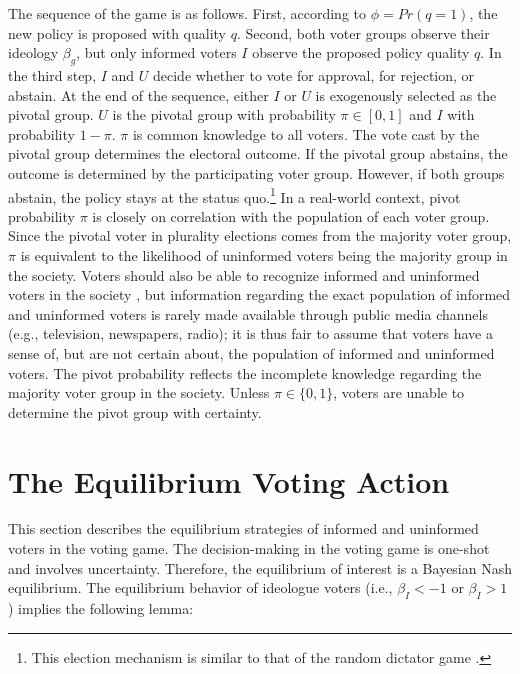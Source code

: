 \documentclass[doc,natbib,12pt]{apa6}
\begin{document}
	\par The sequence of the game is as follows. First, according to $\phi = Pr(q=1)$, the new policy is proposed with quality $q$. Second, both voter groups observe their ideology $\beta_g$, but only informed voters $I$ observe the proposed policy quality $q$. In the third step, $I$ and $U$ decide whether to vote for approval, for rejection, or abstain. At the end of the sequence, either $I$ or $U$ is exogenously selected as the pivotal group. $U$ is the pivotal group with probability $\pi \in [0, 1]$ and $I$ with probability $1-\pi$. $\pi$ is common knowledge to all voters. The vote cast by the pivotal group determines the electoral outcome. If the pivotal group abstains, the outcome is determined by the participating voter group. However, if both groups abstain, the policy stays at the status quo.\footnote{This election mechanism is similar to that of the random dictator game \citep{Morton2015whmo}.} In a real-world context, pivot probability $\pi$ is closely on correlation with the population of each voter group. Since the pivotal voter in plurality elections comes from the majority voter group, $\pi$ is equivalent to the likelihood of uninformed voters being the majority group in the society. Voters should also be able to recognize informed and uninformed voters in the society \citep{Huckfeldt2001thso}, but information regarding the exact population of informed and uninformed voters is rarely made available through public media channels (e.g., television, newspapers, radio); it is thus fair to assume that voters have a sense of, but are not certain about, the population of informed and uninformed voters. The pivot probability reflects the incomplete knowledge regarding the majority voter group in the society. Unless $\pi \in \{0, 1\}$, voters are unable to determine the pivot group with certainty.
	
	\section{The Equilibrium Voting Action}
	
	\par This section describes the equilibrium strategies of informed and uninformed voters in the voting game. The decision-making in the voting game is one-shot and involves uncertainty. Therefore, the equilibrium of interest is a Bayesian Nash equilibrium. The equilibrium behavior of ideologue voters (i.e., $\beta_I < -1$ or $\beta_I > 1$) implies the following lemma:
	
\end{document}
